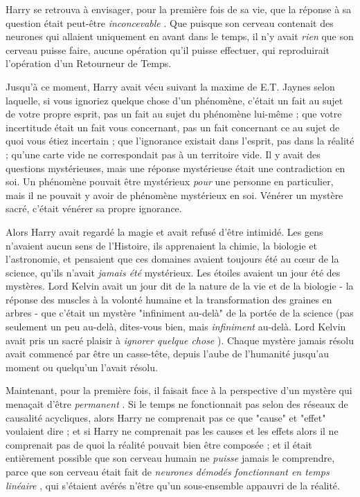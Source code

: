 Harry se retrouva à envisager, pour la première fois de sa vie, que la réponse à sa question était peut-être \emph{inconcevable} . Que puisque son cerveau contenait des neurones qui allaient uniquement en avant dans le temps, il n'y avait \emph{rien}  que son cerveau puisse faire, aucune opération qu'il puisse effectuer, qui reproduirait l'opération d'un Retourneur de Temps.

Jusqu'à ce moment, Harry avait vécu suivant la maxime de E.T. Jaynes selon laquelle, si vous ignoriez quelque chose d'un phénomène, c'était un fait au sujet de votre propre esprit, pas un fait au sujet du phénomène lui-même ; que votre incertitude était un fait vous concernant, pas un fait concernant ce au sujet de quoi vous étiez incertain ; que l'ignorance existait dans l'esprit, pas dans la réalité ; qu'une carte vide ne correspondait pas à un territoire vide. Il y avait des questions mystérieuses, mais une réponse mystérieuse était une contradiction en soi. Un phénomène pouvait être mystérieux \emph{pour}  une personne en particulier, mais il ne pouvait y avoir de phénomène mystérieux en soi. Vénérer un mystère sacré, c'était vénérer sa propre ignorance.

Alors Harry avait regardé la magie et avait refusé d'être intimidé. Les gens n'avaient aucun sens de l'Histoire, ils apprenaient la chimie, la biologie et l'astronomie, et pensaient que ces domaines avaient toujours été au cœur de la science, qu'ils n'avait \emph{jamais été}  mystérieux. Les étoiles avaient un jour été des mystères. Lord Kelvin avait un jour dit de la nature de la vie et de la biologie - la réponse des muscles à la volonté humaine et la transformation des graines en arbres - que c'était un mystère "infiniment au-delà" de la portée de la science (pas seulement un peu au-delà, dites-vous bien, mais \emph{infiniment}  au-delà. Lord Kelvin avait pris un sacré plaisir à \emph{ignorer quelque chose} ). Chaque mystère jamais résolu avait commencé par être un casse-tête, depuis l'aube de l'humanité jusqu'au moment ou quelqu'un l'avait résolu.

Maintenant, pour la première fois, il faisait face à la perspective d'un mystère qui menaçait d'être \emph{permanent} . Si le temps ne fonctionnait pas selon des réseaux de causalité acycliques, alors Harry ne comprenait pas ce que "cause" et "effet" voulaient dire ; et si Harry ne comprenait pas les causes et les effets alors il ne comprenait pas de quoi la réalité pouvait bien être composée ; et il était entièrement possible que son cerveau humain ne \emph{puisse}  jamais le comprendre, parce que son cerveau était fait de \emph{neurones démodés fonctionnant en temps linéaire} , qui s'étaient avérés n'être qu'un sous-ensemble appauvri de la réalité.

